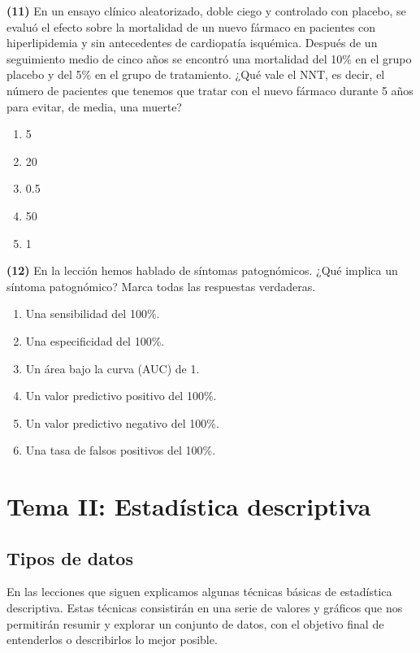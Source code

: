 \documentclass[
]{book}
\providecommand{\tightlist}{%
  \setlength{\itemsep}{0pt}\setlength{\parskip}{0pt}}
\theoremstyle{definition}
\theoremstyle{definition}
\theoremstyle{definition}
\theoremstyle{definition}
\theoremstyle{remark}
\begin{document}
\textbf{(11)} En un ensayo clínico aleatorizado, doble ciego
y controlado con placebo, se evaluó el efecto
sobre la mortalidad de un nuevo fármaco en
pacientes con hiperlipidemia y sin antecedentes
de cardiopatía isquémica. Después de un seguimiento
medio de cinco años se encontró una
mortalidad del 10\% en el grupo placebo y del
5\% en el grupo de tratamiento. ¿Qué vale el
NNT, es decir, el número de pacientes
que tenemos que tratar con el nuevo fármaco
durante 5 años para evitar, de media, una muerte?

\begin{enumerate}
\def\labelenumi{\arabic{enumi}.}
\tightlist
\item
  5
\item
  20
\item
  0.5
\item
  50
\item
  1
\end{enumerate}

\textbf{(12)} En la lección hemos hablado de síntomas patognómicos. ¿Qué implica un síntoma patognómico? Marca todas las respuestas verdaderas.

\begin{enumerate}
\def\labelenumi{\arabic{enumi}.}
\tightlist
\item
  Una sensibilidad del 100\%.
\item
  Una especificidad del 100\%.
\item
  Un área bajo la curva (AUC) de 1.
\item
  Un valor predictivo positivo del 100\%.
\item
  Un valor predictivo negativo del 100\%.
\item
  Una tasa de falsos positivos del 100\%.
\end{enumerate}

\hypertarget{part-tema-ii-estaduxedstica-descriptiva}{%
\part*{Tema II: Estadística descriptiva}\label{part-tema-ii-estaduxedstica-descriptiva}}

\hypertarget{tipos-de-datos}{%
\chapter{Tipos de datos}\label{tipos-de-datos}}

En las lecciones que siguen explicamos algunas técnicas básicas de estadística descriptiva. Estas técnicas consistirán en una serie de valores y gráficos que nos permitirán resumir y explorar un conjunto de datos, con el objetivo final de entenderlos o describirlos lo mejor posible.
\end{document}
